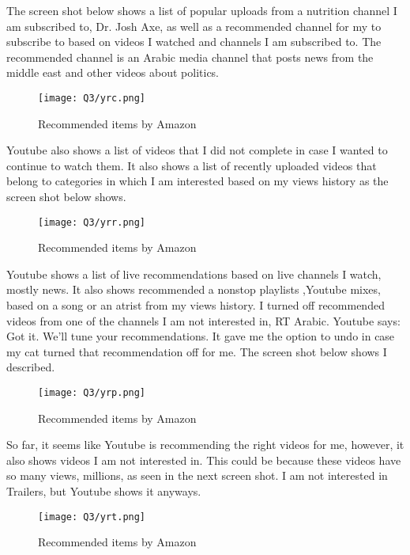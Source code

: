 \pagebreak

The screen shot below shows a list of popular uploads from a nutrition channel I am subscribed to, Dr. Josh Axe, as well as a recommended channel for my to subscribe to based on videos I watched and channels I am subscribed to. The recommended channel is an Arabic media channel that posts news from the middle east and other videos about politics.

\begin{figure}[h]
\caption{Recommended items by Amazon}
\centering
\texttt{[image: Q3/yrc.png]}
\end{figure}

\pagebreak

Youtube also shows a list of videos that I did not complete in case I wanted to continue to watch them. It also shows a list of recently uploaded videos that belong to categories in which I am interested based on my views history as the screen shot below shows.

\begin{figure}[h]
\caption{Recommended items by Amazon}
\centering
\texttt{[image: Q3/yrr.png]}
\end{figure}

\pagebreak

Youtube shows a list of live recommendations based on live channels I watch, mostly news. It also shows recommended a nonstop playlists ,Youtube mixes, based on a song or an atrist from my views history. I turned off recommended videos from one of the channels I am not interested in, RT Arabic. Youtube says: Got it. We'll tune your recommendations. It gave me the option to undo in case my cat turned that recommendation off for me. The screen shot below shows I described.


\begin{figure}[h]
\caption{Recommended items by Amazon}
\centering
\texttt{[image: Q3/yrp.png]}
\end{figure}

\pagebreak

So far, it seems like Youtube is recommending the right videos for me, however, it also shows videos I am not interested in. This could be because these videos have so many views, millions, as seen in the next screen shot. I am not interested in Trailers, but Youtube shows it anyways.

\begin{figure}[h]
\caption{Recommended items by Amazon}
\centering
\texttt{[image: Q3/yrt.png]}
\end{figure}

